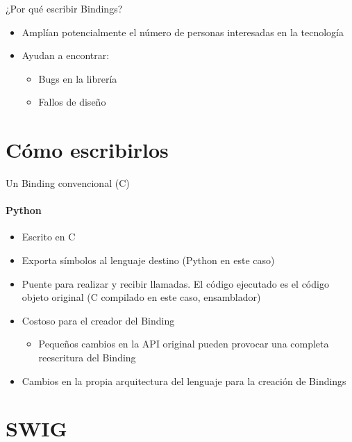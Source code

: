 \documentclass{beamer}
\begin{document}
\begin{frame}{¿Por qué escribir Bindings?}
  \begin{itemize}
    \item Amplían potencialmente el número de personas interesadas en la tecnología
    \medskip
    \item Ayudan a encontrar:
    \begin{itemize}
      \item Bugs en la librería
      \item Fallos de diseño
    \end{itemize}
  \end{itemize}
\end{frame}

\section{Cómo escribirlos}

\begin{frame}{Un Binding convencional (C)}
   \framesubtitle{Python}
   \begin{itemize}
     \item Escrito en C
     \medskip
     \item Exporta símbolos al lenguaje destino (Python en este caso)
     \medskip
     \item Puente para realizar y recibir llamadas. El código ejecutado es el código objeto original (C compilado en este caso, ensamblador)
     \medskip
     \item Costoso para el creador del Binding
     \begin{itemize}
       \item Pequeños cambios en la API original pueden provocar una completa reescritura del Binding
     \end{itemize}
     \medskip
     \item Cambios en la propia arquitectura del lenguaje para la creación de Bindings
   \end{itemize}
\end{frame}


\section{SWIG}
\end{document}
